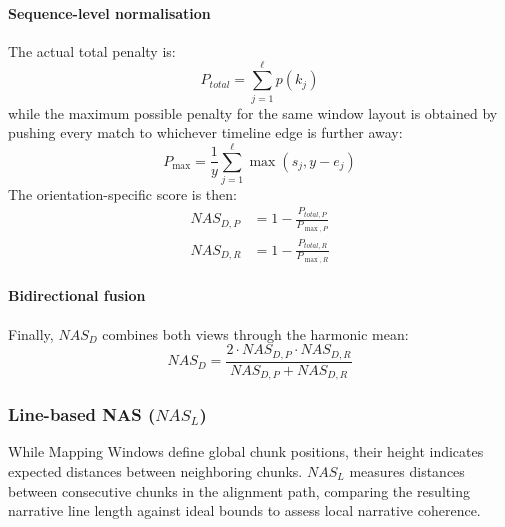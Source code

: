 \documentclass[main.tex]{subfiles}
\begin{document}
\paragraph{Sequence-level normalisation}
The actual total penalty is:
\begin{equation}
P_{total} = \sum_{j=1}^{\ell} p(k_j)
\end{equation}
while the maximum possible penalty for the same window layout is obtained by pushing every match to whichever timeline edge is further away:
\begin{equation}
P_{\max} = \frac{1}{y} \sum_{j=1}^{\ell} \max(s_j, y - e_j)
\end{equation}
The orientation-specific score is then:
\begin{align}
NAS_{D,P} &= 1 - \frac{P_{total,P}}{P_{\max,P}} \\
NAS_{D,R} &= 1 - \frac{P_{total,R}}{P_{\max,R}}
\end{align}

\paragraph{Bidirectional fusion}
Finally, $NAS_D$ combines both views through the harmonic mean:
\begin{equation}
NAS_D = \frac{2 \cdot NAS_{D,P} \cdot NAS_{D,R}}{NAS_{D,P} + NAS_{D,R}}
\end{equation}

\subsubsection{Line-based NAS ($NAS_L$)}
While Mapping Windows define global chunk positions, their height indicates expected distances between neighboring chunks. $NAS_L$ measures distances between consecutive chunks in the alignment path, comparing the resulting narrative line length against ideal bounds to assess local narrative coherence.
\end{document}
